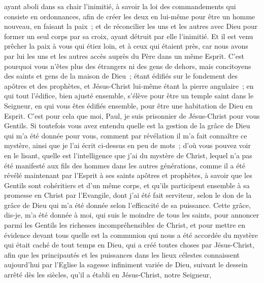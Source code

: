 \begin{multicols}{2}
ayant aboli dans sa chair l'inimitié, à savoir la loi des commandements qui consiste en ordonnances, afin de créer les deux en lui-même pour être un homme nouveau, en faisant la paix~;
et de réconcilier les uns et les autres avec Dieu pour former un seul corps par sa croix, ayant détruit par elle l'inimitié.
Et il est venu prêcher la paix à vous qui étiez loin, et à ceux qui étaient près,
car nous avons par lui les uns et les autres accès auprès du Père dans un même Esprit.
C'est pourquoi vous n'êtes plus des étrangers ni des gens de dehors, mais concitoyens des saints et gens de la maison de Dieu~;
étant édifiés sur le fondement des apôtres et des prophètes, et Jésus-Christ lui-même étant la pierre angulaire~;
en qui tout l'édifice, bien ajusté ensemble, s'élève pour être un temple saint dans le Seigneur,
en qui vous êtes édifiés ensemble, pour être une habitation de Dieu en Esprit.
\VerseOne{}C'est pour cela que moi, Paul, je suis prisonnier de Jésus-Christ pour vous Gentils.
Si toutefois vous avez entendu quelle est la gestion de la grâce de Dieu qui m'a été donnée pour vous,
comment par révélation il m'a fait connaître ce mystère, ainsi que je l'ai écrit ci-dessus en peu de mots~;
d'où vous pouvez voir en le lisant, quelle est l'intelligence que j'ai du mystère de Christ,
lequel n'a pas été manifesté aux fils des hommes dans les autres générations, comme il a été révélé maintenant par l'Esprit à ses saints apôtres et prophètes,
à savoir que les Gentils sont cohéritiers et d'un même corps, et qu'ils participent ensemble à sa promesse en Christ par l'Evangile,
dont j'ai été fait serviteur, selon le don de la grâce de Dieu qui m'a été donnée selon l'efficacité de sa puissance.
Cette grâce, dis-je, m'a été donnée à moi, qui suis le moindre de tous les saints, pour annoncer parmi les Gentils les richesses incompréhensibles de Christ,
et pour mettre en évidence devant tous quelle est la communion qui nous a été accordée du mystère qui était caché de tout temps en Dieu, qui a créé toutes choses par Jésus-Christ,
afin que les principautés et les puissances dans les lieux célestes connaissent aujourd'hui par l'Eglise la sagesse infiniment variée de Dieu,
suivant le dessein arrêté dès les siècles, qu'il a établi en Jésus-Christ, notre Seigneur,

\end{multicols}
